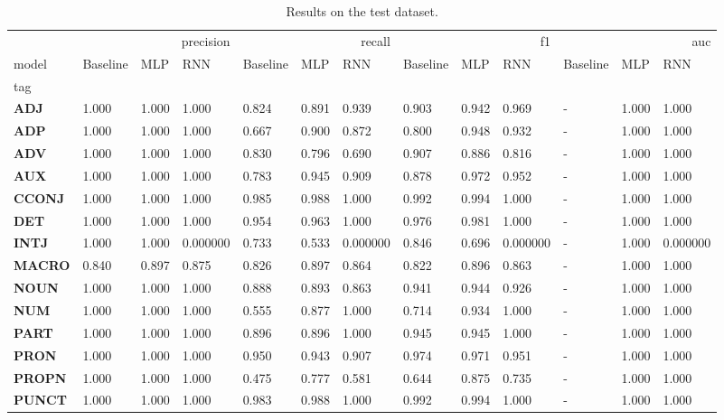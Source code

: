 \begin{table}
\caption{Results on the test dataset.}
\label{tab::ex_2_test}
\begin{tabular}{|l||l||l||l||l||l||l||l||l||l||l||l||l|}
\toprule
 & \multicolumn{3}{r}{precision} & \multicolumn{3}{r}{recall} & \multicolumn{3}{r}{f1} & \multicolumn{3}{r}{auc} \\
model & Baseline & MLP & RNN & Baseline & MLP & RNN & Baseline & MLP & RNN & Baseline & MLP & RNN \\
tag &  &  &  &  &  &  &  &  &  &  &  &  \\
\midrule
\textbf{ADJ} & 1.000 & 1.000 & 1.000 & 0.824 & 0.891 & 0.939 & 0.903 & 0.942 & 0.969 & - & 1.000 & 1.000 \\
\textbf{ADP} & 1.000 & 1.000 & 1.000 & 0.667 & 0.900 & 0.872 & 0.800 & 0.948 & 0.932 & - & 1.000 & 1.000 \\
\textbf{ADV} & 1.000 & 1.000 & 1.000 & 0.830 & 0.796 & 0.690 & 0.907 & 0.886 & 0.816 & - & 1.000 & 1.000 \\
\textbf{AUX} & 1.000 & 1.000 & 1.000 & 0.783 & 0.945 & 0.909 & 0.878 & 0.972 & 0.952 & - & 1.000 & 1.000 \\
\textbf{CCONJ} & 1.000 & 1.000 & 1.000 & 0.985 & 0.988 & 1.000 & 0.992 & 0.994 & 1.000 & - & 1.000 & 1.000 \\
\textbf{DET} & 1.000 & 1.000 & 1.000 & 0.954 & 0.963 & 1.000 & 0.976 & 0.981 & 1.000 & - & 1.000 & 1.000 \\
\textbf{INTJ} & 1.000 & 1.000 & 0.000000 & 0.733 & 0.533 & 0.000000 & 0.846 & 0.696 & 0.000000 & - & 1.000 & 0.000000 \\
\textbf{MACRO} & 0.840 & 0.897 & 0.875 & 0.826 & 0.897 & 0.864 & 0.822 & 0.896 & 0.863 & - & 1.000 & 1.000 \\
\textbf{NOUN} & 1.000 & 1.000 & 1.000 & 0.888 & 0.893 & 0.863 & 0.941 & 0.944 & 0.926 & - & 1.000 & 1.000 \\
\textbf{NUM} & 1.000 & 1.000 & 1.000 & 0.555 & 0.877 & 1.000 & 0.714 & 0.934 & 1.000 & - & 1.000 & 1.000 \\
\textbf{PART} & 1.000 & 1.000 & 1.000 & 0.896 & 0.896 & 1.000 & 0.945 & 0.945 & 1.000 & - & 1.000 & 1.000 \\
\textbf{PRON} & 1.000 & 1.000 & 1.000 & 0.950 & 0.943 & 0.907 & 0.974 & 0.971 & 0.951 & - & 1.000 & 1.000 \\
\textbf{PROPN} & 1.000 & 1.000 & 1.000 & 0.475 & 0.777 & 0.581 & 0.644 & 0.875 & 0.735 & - & 1.000 & 1.000 \\
\textbf{PUNCT} & 1.000 & 1.000 & 1.000 & 0.983 & 0.988 & 1.000 & 0.992 & 0.994 & 1.000 & - & 1.000 & 1.000 \\

\end{tabular}
\end{table}
